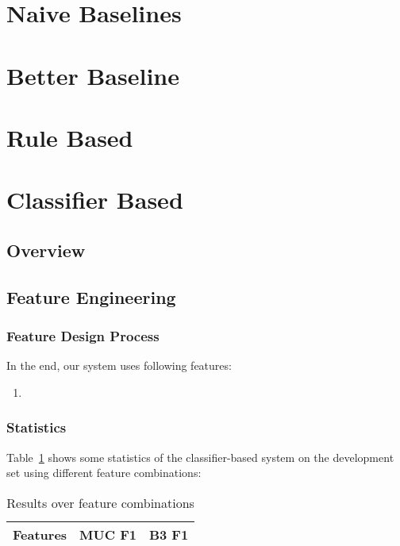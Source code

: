 \documentclass[12pt, twocolumn]{article}
\begin{document}

\section{Naive Baselines}

\section{Better Baseline}

\section{Rule Based}

\section{Classifier Based}
\subsection{Overview}

\subsection{Feature Engineering}
\subsubsection{Feature Design Process}

In the end, our system uses following features:
\begin{enumerate}[(1)]
\item 
\end{enumerate}
\subsubsection{Statistics}
Table~\ref{tab:features} shows some statistics of the classifier-based system on the development set using different feature combinations:
\begin{table}[H]
\begin{center}
\begin{tabular}{|c|c|c|}
\hline
Features & MUC F1 & B3 F1\\\hline
\end{tabular}
\end{center}
\caption{Results over feature combinations}
\label{tab:features}
\end{table}
\end{document}
